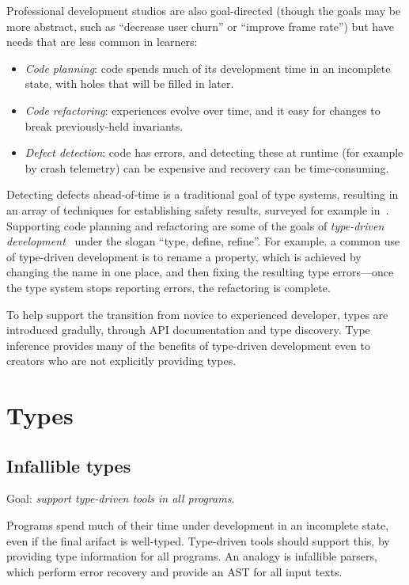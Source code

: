 \documentclass[acmsmall]{acmart}
\begin{document}
Professional development studios are also goal-directed (though the
goals may be more abstract, such as ``decrease user churn'' or
``improve frame rate'') but have needs that are less common in
learners:
\begin{itemize}

\item \emph{Code planning}:
  code spends much of its development time in an incomplete state,
  with holes that will be filled in later.

\item \emph{Code refactoring}:
  experiences evolve over time, and it easy for changes to
  break previously-held invariants.

\item \emph{Defect detection}:
  code has errors, and detecting these at runtime (for example by crash telemetry)
  can be expensive and recovery can be time-consuming.
  
\end{itemize}
Detecting defects ahead-of-time is a traditional goal of type systems,
resulting in an array of techniques for establishing safety results,
surveyed for example in~\cite{TAPL}. Supporting code planning and
refactoring are some of the goals of \emph{type-driven
development}~\cite{TDDIdris} under the slogan ``type, define,
refine''.  For example. a common use of type-driven development is to
rename a property, which is achieved by changing the name in one place,
and then fixing the resulting type errors---once the type system stops
reporting errors, the refactoring is complete.

To help support the transition from novice to experienced developer,
types are introduced gradully, through API documentation and type discovery.
Type inference provides many of the benefits of type-driven development
even to creators who are not explicitly providing types.

\section{Types}
\subsection{Infallible types}

Goal: \emph{support type-driven tools in all programs}.

Programs spend much of their time under development in an incomplete state, even if the final arifact
is well-typed. Type-driven tools should support this, by providing type information for all programs.
An analogy is infallible parsers, which perform error recovery and provide an AST for all input texts.
\end{document}
